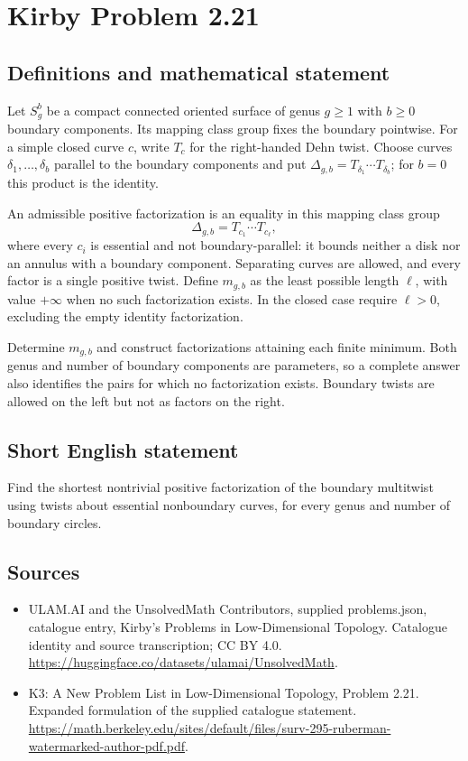 \documentclass[11pt,a4paper]{article}
\begin{document}
\section*{Kirby Problem 2.21}\label{statement}

\subsection{Definitions and mathematical statement}
Let $S_g^b$ be a compact connected oriented surface of genus $g\geq1$ with
$b\geq0$ boundary components. Its mapping class group fixes the boundary
pointwise. For a simple closed curve $c$, write $T_c$ for the right-handed
Dehn twist. Choose curves $\delta_1,\ldots,\delta_b$ parallel to the boundary
components and put $\Delta_{g,b}=T_{\delta_1}\cdots T_{\delta_b}$; for $b=0$
this product is the identity.

An admissible positive factorization is an equality in this mapping class group
\[
 \Delta_{g,b}=T_{c_1}\cdots T_{c_\ell},
\]
where every $c_i$ is essential and not boundary-parallel: it bounds neither a
disk nor an annulus with a boundary component. Separating curves are allowed,
and every factor is a single positive twist. Define $m_{g,b}$ as the least
possible length $\ell$, with value $+\infty$ when no such factorization exists.
In the closed case require $\ell>0$, excluding the empty identity factorization.

Determine $m_{g,b}$ and construct factorizations attaining each finite minimum.
Both genus and number of boundary components are parameters, so a complete
answer also identifies the pairs for which no factorization exists. Boundary
twists are allowed on the left but not as factors on the right.
\subsection{Short English statement}
Find the shortest nontrivial positive factorization of the boundary multitwist using twists about essential nonboundary curves, for every genus and number of boundary circles.
\subsection{Sources}
\begin{itemize}
\item[S1] ULAM.AI and the UnsolvedMath Contributors, supplied problems.json, catalogue entry, Kirby's Problems in Low-Dimensional Topology. Catalogue identity and source transcription; CC BY 4.0.
\url{https://huggingface.co/datasets/ulamai/UnsolvedMath}.
\item[S2] K3: A New Problem List in Low-Dimensional Topology, Problem 2.21. Expanded formulation of the supplied catalogue statement.
\url{https://math.berkeley.edu/sites/default/files/surv-295-ruberman-watermarked-author-pdf.pdf}.
\end{itemize}
\end{document}
